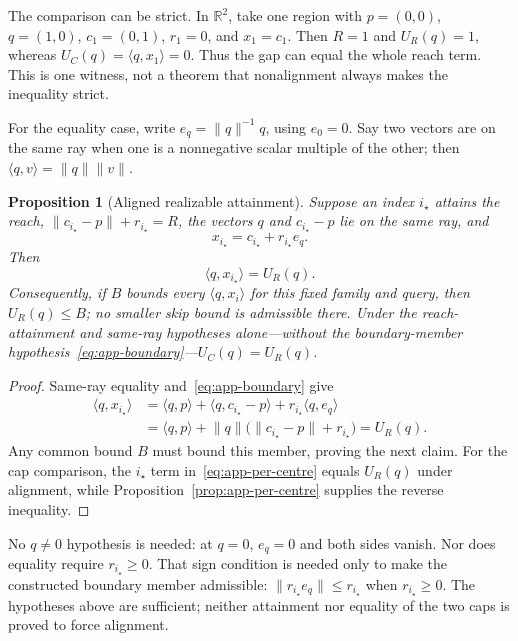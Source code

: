 \documentclass[11pt]{article}
\numberwithin{equation}{section}
\newtheorem{proposition}{Proposition}
\newcommand{\R}{\mathbb{R}}
\newcommand{\inner}[2]{\langle #1, #2\rangle}
\begin{document}
The comparison can be strict. In $\R^2$, take one region with $p=(0,0)$, $q=(1,0)$,
$c_1=(0,1)$, $r_1=0$, and $x_1=c_1$. Then $R=1$ and $U_R(q)=1$, whereas
$U_C(q)=\inner{q}{x_1}=0$. Thus the gap can equal the whole reach term. This is one witness, not a
theorem that nonalignment always makes the inequality strict.

For the equality case, write $e_q=\lVert q\rVert^{-1}q$, using $e_0=0$. Say two vectors are on the same ray
when one is a nonnegative scalar multiple of the other; then
$\inner{q}{v}=\lVert q\rVert\lVert v\rVert$.

\begin{proposition}[Aligned realizable attainment]\label{prop:app-attainment}
Suppose an index $i_\star$ attains the reach,
$\lVert c_{i_\star}-p\rVert+r_{i_\star}=R$, the vectors $q$ and $c_{i_\star}-p$ lie on the same ray, and
\begin{equation}\label{eq:app-boundary}
x_{i_\star}=c_{i_\star}+r_{i_\star}e_q .
\end{equation}
Then
\[
\inner{q}{x_{i_\star}}=U_R(q).
\]
Consequently, if $B$ bounds every $\inner{q}{x_i}$ for this fixed family and query, then
$U_R(q)\le B$; no smaller skip bound is admissible there. Under the reach-attainment and same-ray hypotheses
alone---without the boundary-member hypothesis~\eqref{eq:app-boundary}---$U_C(q)=U_R(q)$.
\end{proposition}
\begin{proof}
Same-ray equality and~\eqref{eq:app-boundary} give
\[
\begin{aligned}
\inner{q}{x_{i_\star}}
 &=\inner{q}{p}+\inner{q}{c_{i_\star}-p}
   +r_{i_\star}\inner{q}{e_q}\\
 &=\inner{q}{p}+\lVert q\rVert
   \bigl(\lVert c_{i_\star}-p\rVert+r_{i_\star}\bigr)=U_R(q).
\end{aligned}
\]
Any common bound $B$ must bound this member, proving the next claim. For the cap comparison, the
$i_\star$ term in~\eqref{eq:app-per-centre} equals $U_R(q)$ under alignment, while
Proposition~\ref{prop:app-per-centre} supplies the reverse inequality.
\end{proof}

No $q\ne0$ hypothesis is needed: at $q=0$, $e_q=0$ and both sides vanish. Nor does equality require
$r_{i_\star}\ge0$. That sign condition is needed only to make the constructed boundary member admissible:
$\lVert r_{i_\star}e_q\rVert\le r_{i_\star}$ when $r_{i_\star}\ge0$. The hypotheses above are sufficient;
neither attainment nor equality of the two caps is proved to force alignment.
\end{document}
